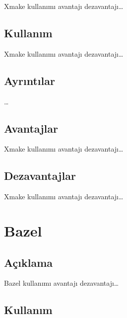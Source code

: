 \documentclass[
]{book}
\begin{document}
Xmake kullanımı avantajı dezavantajı\ldots{}

\hypertarget{kullanux131m-8}{%
\section*{Kullanım}\label{kullanux131m-8}}

Xmake kullanımı avantajı dezavantajı\ldots{}

\hypertarget{ayrux131ntux131lar-8}{%
\section*{Ayrıntılar}\label{ayrux131ntux131lar-8}}

\ldots{}

\hypertarget{avantajlar-8}{%
\section*{Avantajlar}\label{avantajlar-8}}

Xmake kullanımı avantajı dezavantajı\ldots{}

\hypertarget{dezavantajlar-8}{%
\section*{Dezavantajlar}\label{dezavantajlar-8}}

Xmake kullanımı avantajı dezavantajı\ldots{}

\hypertarget{bazel}{%
\chapter*{Bazel}\label{bazel}}

\hypertarget{auxe7ux131klama-10}{%
\section*{Açıklama}\label{auxe7ux131klama-10}}

Bazel kullanımı avantajı dezavantajı\ldots{}

\hypertarget{kullanux131m-9}{%
\section*{Kullanım}\label{kullanux131m-9}}
\end{document}
